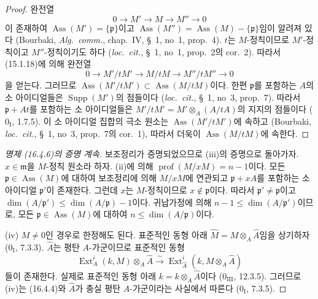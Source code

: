\begin{proof}
완전열
\[
  0\to M'\to M\to M''\to0
\]
이 존재하여 $\operatorname{Ass}(M')=\{\mathfrak{p}\}$이고
$\operatorname{Ass}(M'')=
\operatorname{Ass}(M)-\{\mathfrak{p}\}$임이 알려져 있다
(Bourbaki, \emph{Alg.~comm.}, chap.~IV, \S~1, no~1, prop.~4).
$t$는 $M$-정칙이므로 $M'$-정칙이고 $M''$-정칙이기도 하다
(\emph{loc.~cit.}, \S~1, no~1, prop.~2의 cor.~2). 따라서 (15.1.18)에
의해 완전열
\[
  0\to M'/tM'\to M/tM\to M''/tM''\to0
\]
을 얻는다. 그러므로
$\operatorname{Ass}(M'/tM')\subset\operatorname{Ass}(M/tM)$이다.
한편 $\mathfrak{p}$를 포함하는 $A$의 소 아이디얼들은
$\operatorname{Supp}(M')$의 점들이다
(\emph{loc.~cit.}, \S~1, no~3, prop.~7). 따라서
$\mathfrak{p}+At$를 포함하는 소 아이디얼들은
$M'/tM'=M'\otimes_A(A/tA)$의 지지의 점들이다
($0_{\mathrm I}$, 1.7.5). 이 소 아이디얼 집합의 극소 원소는
$\operatorname{Ass}(M'/tM')$에 속하고
(Bourbaki, \emph{loc.~cit.}, \S~1, no~3, prop.~7의 cor.~1), 따라서
더욱이 $\operatorname{Ass}(M/tM)$에 속한다.
\end{proof}

\begin{proof}[명제 (16.4.6)의 증명 계속]
보조정리가 증명되었으므로 (iii)의 증명으로 돌아가자.
$x\in\mathfrak{m}$을 $M$-정칙 원소라 하자. (ii)에 의해
$\operatorname{prof}(M/xM)=n-1$이다. 모든
$\mathfrak{p}\in\operatorname{Ass}(M)$에 대하여 보조정리에 의해
$M/xM$에 연관되고 $\mathfrak{p}+xA$를 포함하는 소 아이디얼
$\mathfrak{p}'$이 존재한다. 그런데 $x$는 $M$-정칙이므로
$x\notin\mathfrak{p}$이다. 따라서 $\mathfrak{p}'\neq\mathfrak{p}$이고
$\dim(A/\mathfrak{p}')\leq\dim(A/\mathfrak{p})-1$이다.
귀납가정에 의해 $n-1\leq\dim(A/\mathfrak{p}')$이므로, 모든
$\mathfrak{p}\in\operatorname{Ass}(M)$에 대하여
$n\leq\dim(A/\mathfrak{p})$이다.

(iv) $M\neq0$인 경우로 한정해도 된다. 표준적인 동형 아래
$\widehat{M}=M\otimes_A\widehat{A}$임을 상기하자
($0_{\mathrm I}$, 7.3.3). $\widehat{A}$는 평탄 $A$-가군이므로 표준적인
동형
\[
  \operatorname{Ext}^i_A(k,M)\otimes_A\widehat{A}
  \xrightarrow{\sim}
  \operatorname{Ext}^i_{\widehat{A}}
  (k,M\otimes_A\widehat{A})
\]
들이 존재한다. 실제로 표준적인 동형 아래
$k=k\otimes_A\widehat{A}$이다 ($0_{\mathrm{III}}$, 12.3.5).
그러므로 (iv)는 (16.4.4)와 $\widehat{A}$가 충실 평탄 $A$-가군이라는
사실에서 따른다 ($0_{\mathrm I}$, 7.3.5).
\end{proof}

